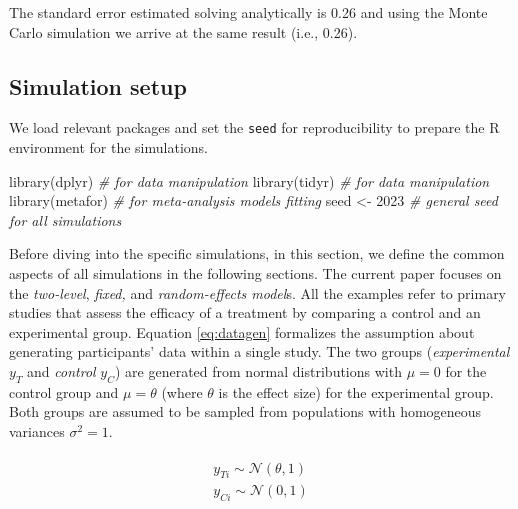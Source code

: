 \documentclass[
  man,floatsintext]{apa6}
\newenvironment{Shaded}{\begin{snugshade}}{\end{snugshade}}
\newcommand{\CommentTok}[1]{\textcolor[rgb]{0.56,0.35,0.01}{\textit{#1}}}
\newcommand{\DecValTok}[1]{\textcolor[rgb]{0.00,0.00,0.81}{#1}}
\newcommand{\FunctionTok}[1]{\textcolor[rgb]{0.00,0.00,0.00}{#1}}
\newcommand{\NormalTok}[1]{#1}
\newcommand{\OtherTok}[1]{\textcolor[rgb]{0.56,0.35,0.01}{#1}}
\begin{document}
\normalsize

The standard error estimated solving analytically is 0.26 and using the Monte Carlo simulation we arrive at the same result (i.e., 0.26).

\hypertarget{simulation-setup}{%
\subsection{Simulation setup}\label{simulation-setup}}

We load relevant packages and set the \texttt{seed} for reproducibility to prepare the R environment for the simulations.

\scriptsize

\begin{Shaded}
\begin{Highlighting}[]
\FunctionTok{library}\NormalTok{(dplyr) }\CommentTok{\# for data manipulation}
\FunctionTok{library}\NormalTok{(tidyr) }\CommentTok{\# for data manipulation}
\FunctionTok{library}\NormalTok{(metafor) }\CommentTok{\# for meta{-}analysis models fitting}
\NormalTok{seed }\OtherTok{\textless{}{-}} \DecValTok{2023} \CommentTok{\# general seed for all simulations}
\end{Highlighting}
\end{Shaded}

\normalsize

Before diving into the specific simulations, in this section, we define the common aspects of all simulations in the following sections. The current paper focuses on the \emph{two-level}, \emph{fixed,} and \emph{random-effects model}s. All the examples refer to primary studies that assess the efficacy of a treatment by comparing a control and an experimental group. Equation \eqref{eq:datagen} formalizes the assumption about generating participants' data within a single study. The two groups (\emph{experimental} \(y_{T}\) and \emph{control} \(y_{C}\)) are generated from normal distributions with \(\mu = 0\) for the control group and \(\mu = \theta\) (where \(\theta\) is the effect size) for the experimental group. Both groups are assumed to be sampled from populations with homogeneous variances \(\sigma^{2} = 1\).

\begin{align}
\begin{gathered}
y_{Ti} \sim \mathcal{N}(\theta, 1) \\
y_{Ci} \sim \mathcal{N}(0, 1)
\label{eq:datagen}
\end{gathered}
\end{align}
\end{document}
